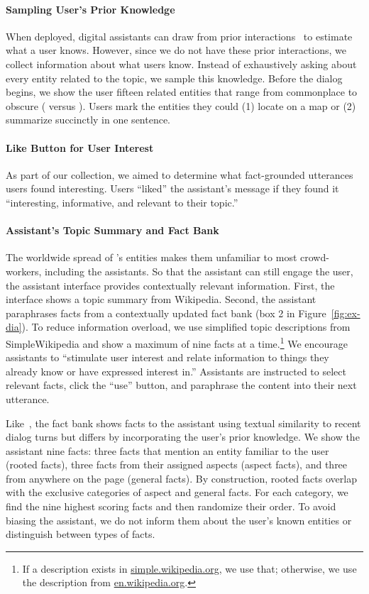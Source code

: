 \paragraph{Sampling User's Prior Knowledge}
When deployed, digital assistants can draw from prior interactions~\citep{Ram2018ConversationalAT} to estimate what a user knows.
However, since we do not have these prior interactions, we collect information about what users know.
Instead of exhaustively asking about every entity related to the topic, we sample this knowledge.
Before the dialog begins, we show the user fifteen related entities that range from commonplace to obscure ( versus ).
Users mark the entities they could (1) locate on a map or (2) summarize succinctly in one sentence.

\paragraph{Like Button for User Interest}
As part of our collection, we aimed to determine what fact-grounded utterances users found interesting.
Users ``liked'' the assistant's message if they found it ``interesting, informative, and relevant to their topic.''

\paragraph{Assistant's Topic Summary and Fact Bank}
The worldwide spread of \rover{}'s entities makes them unfamiliar to most crowd-workers, including the assistants.
So that the assistant can still engage the user, the assistant interface provides contextually relevant information.
First, the interface shows a topic summary from Wikipedia.
Second, the assistant paraphrases facts from a contextually updated fact bank (box 2 in Figure~\ref{fig:ex-dia}).
To reduce information overload, we use simplified topic descriptions from SimpleWikipedia and show a maximum of nine facts at a time.\footnote{
    If a description exists in \href{https://simple.wikipedia.org/}{simple.wikipedia.org}, we use that; otherwise, we use the description from \href{https://en.wikipedia.org/}{en.wikipedia.org}.}
We encourage assistants to ``stimulate user interest and relate information to things they already know or have expressed interest in.''
Assistants are instructed to select relevant facts, click the ``use'' button, and paraphrase the content into their next utterance.

Like~\citet{dinan2019wizard}, the fact bank shows facts to the assistant using \tfidf{} textual similarity to recent dialog turns but differs by incorporating the user's prior knowledge.
We show the assistant nine facts: three facts that mention an entity familiar to the user (rooted facts), three facts from their assigned aspects (aspect facts), and three from anywhere on the page (general facts).
By construction, rooted facts overlap with the exclusive categories of aspect and general facts.
For each category, we find the nine highest  scoring facts and then randomize their order.
To avoid biasing the assistant, we do not inform them about the user's known entities or distinguish between types of facts.


